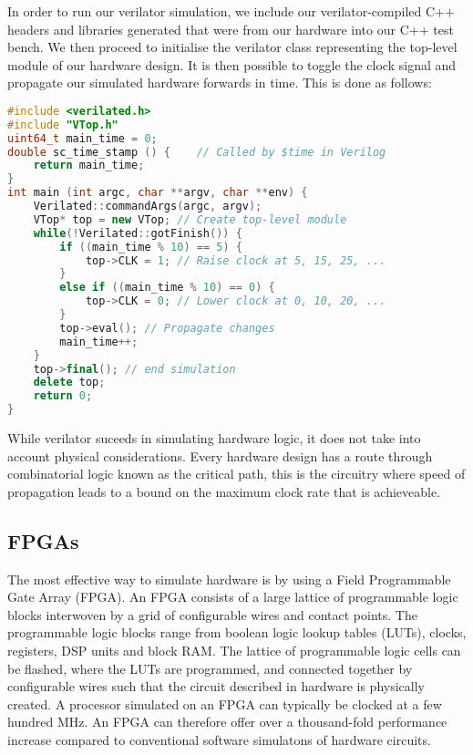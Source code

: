 \documentclass[a4paper,8pt]{report}
\begin{document}
In order to run our verilator simulation, we include our verilator-compiled C++
headers and libraries generated that were from our hardware into our C++ test
bench. We then proceed to initialise the verilator class representing the
top-level module of our hardware design. It is then possible to toggle the clock
signal and propagate our simulated hardware forwards in time. This is done as
follows:
\begin{lstlisting}[language=C++,style=customcpp]
#include <verilated.h>
#include "VTop.h"
uint64_t main_time = 0;
double sc_time_stamp () {    // Called by $time in Verilog
    return main_time;
}
int main (int argc, char **argv, char **env) {
    Verilated::commandArgs(argc, argv);
    VTop* top = new VTop; // Create top-level module
    while(!Verilated::gotFinish()) {
        if ((main_time % 10) == 5) {
            top->CLK = 1; // Raise clock at 5, 15, 25, ...
        }
        else if ((main_time % 10) == 0) {
            top->CLK = 0; // Lower clock at 0, 10, 20, ...
        }
        top->eval(); // Propagate changes
        main_time++;
    }
    top->final(); // end simulation
    delete top;
    return 0;
}

\end{lstlisting}


While verilator suceeds in simulating hardware logic, it does not take into
account physical considerations. Every hardware design has a route through
combinatorial logic known as the critical path, this is the circuitry where
speed of propagation leads to a bound on the maximum clock rate that is
achieveable.


\subsection{FPGAs}
The most effective way to simulate hardware is by using a Field Programmable
Gate Array (FPGA). An FPGA consists of a large lattice of programmable logic
blocks interwoven by a grid of configurable wires and contact points. The programmable
logic blocks range from boolean logic lookup tables (LUTs), clocks, registers, DSP units and
block RAM. The lattice of programmable logic cells can be flashed, where the LUTs
are programmed, and connected together by configurable wires such that the
circuit described in hardware is physically created. A processor simulated on an
FPGA can typically be clocked at a few hundred MHz. An FPGA can therefore offer
over a thousand-fold performance increase compared to conventional software
simulatons of hardware circuits.
\end{document}
